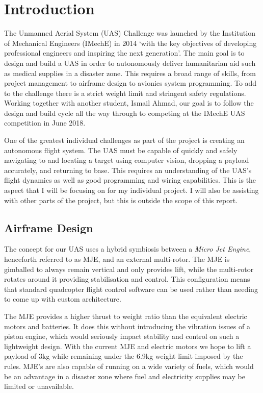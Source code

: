 \documentclass[11pt]{article}
\begin{document}
\section{Introduction}
The Unmanned Aerial System (UAS) Challenge was launched by the Institution of Mechanical Engineers (IMechE) in 2014 `with the key objectives of developing professional engineers and inspiring the next generation'\cite{IMechE_about_uas}. The main goal is to design and build a UAS in order to autonomously deliver humanitarian aid such as medical supplies in a disaster zone. This requires a broad range of skills, from project management to airframe design to avionics system programming. To add to the challenge there is a strict weight limit and stringent safety regulations. Working together with another student, Ismail Ahmad, our goal is to follow the design and build cycle all the way through to competing at the IMechE UAS competition in June 2018.

One of the greatest individual challenges as part of the project is creating an autonomous flight system. The UAS must be capable of quickly and safely navigating to and locating a target using computer vision, dropping a payload accurately, and returning to base. This requires an understanding of the UAS’s flight dynamics as well as good programming and wiring capabilities. This is the aspect that I will be focusing on for my individual project. I will also be assisting with other parts of the project, but this is outside the scope of this report.


\subsection{Airframe Design}
The concept for our UAS uses a hybrid symbiosis between a \emph{Micro Jet Engine}, henceforth referred to as MJE, and an external multi-rotor. The MJE is gimballed to always remain vertical and only provides lift, while the multi-rotor rotates around it providing stabilisation and control. This configuration means that standard quadcopter flight control software can be used rather than needing to come up with custom architecture.

The MJE provides a higher thrust to weight ratio than the equivalent electric motors and batteries. It does this without introducing the vibration issues of a piston engine, which would seriously impact stability and control on such a lightweight design. With the current MJE and electric motors we hope to lift a payload of 3kg while remaining under the 6.9kg weight limit imposed by the rules\cite{IMechE_rules}. MJE's are also capable of running on a wide variety of fuels, which would be an advantage in a disaster zone where fuel and electricity supplies may be limited or unavailable\cite{Ismail_paper}.
\end{document}

